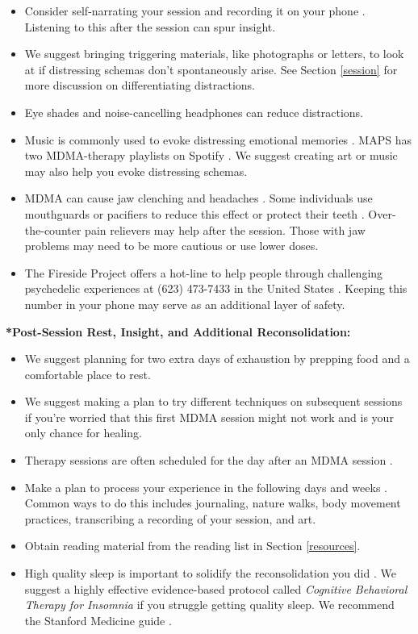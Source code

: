 \documentclass[12pt,letterpaper]{article}
\begin{document}
\begin{itemize}
    \item Consider self-narrating your session and recording it on your phone \cite{mithoeferManual}. Listening to this after the session can spur insight.
    \item We suggest bringing triggering materials, like photographs or letters, to look at if distressing schemas don't spontaneously arise. See Section \ref{session} for more discussion on differentiating distractions.
    \item Eye shades and noise-cancelling headphones can reduce distractions.
    \item Music is commonly used to evoke distressing emotional memories \cite{mithoeferManual}. MAPS has two MDMA-therapy playlists on Spotify \cite{mapsMusicA,mapsMusicB}. We suggest creating art or music may also help you evoke distressing schemas.
    \item MDMA can cause jaw clenching and headaches \cite{mitchellMDMAClinicalTrial2,liechtiGender}. Some individuals use mouthguards or pacifiers to reduce this effect or protect their teeth \cite{emdeEmergency}. Over-the-counter pain relievers may help after the session. Those with jaw problems may need to be more cautious or use lower doses. 
    \item The Fireside Project offers a hot-line to help people through challenging psychedelic experiences at (623) 473-7433 in the United States \cite{firesideProject}. Keeping this number in your phone may serve as an additional layer of safety.
\end{itemize}
\noindent \textbf{*Post-Session Rest, Insight, and Additional Reconsolidation:}
\begin{itemize}
    \item We suggest planning for two extra days of exhaustion by prepping food and a comfortable place to rest. 
    \item We suggest making a plan to try different techniques on subsequent sessions if you're worried that this first MDMA session might not work and is your only chance for healing.
    \item Therapy sessions are often scheduled for the day after an MDMA session \cite{mithoeferManual}. 
    \item Make a plan to process your experience in the following days and weeks \cite{mithoeferManual}. Common ways to do this includes journaling, nature walks, body movement practices, transcribing a recording of your session, and art. 
    \item Obtain reading material from the reading list in Section \ref{resources}.
    \item High quality sleep is important to solidify the reconsolidation you did \cite{walkerSleep}. We suggest a highly effective evidence-based protocol called \textit{Cognitive Behavioral Therapy for Insomnia} if you struggle getting quality sleep. We recommend the Stanford Medicine guide \cite{stanfordSleep}.
\end{itemize}
\end{document}

